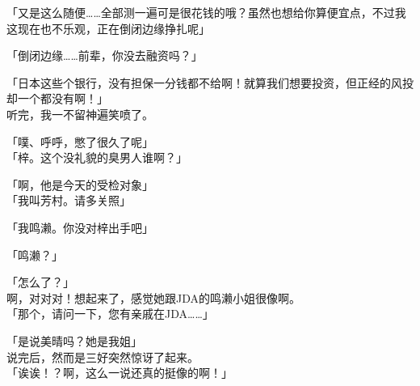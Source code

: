 「又是这么随便……全部测一遍可是很花钱的哦？虽然也想给你算便宜点，不过我这现在也不乐观，正在倒闭边缘挣扎呢」

「倒闭边缘……前辈，你没去融资吗？」

「日本这些个银行，没有担保一分钱都不给啊！就算我们想要投资，但正经的风投却一个都没有啊！」\\

听完，我一不留神遍笑喷了。

「噗、呼呼，憋了很久了呢」\\

「梓。这个没礼貌的臭男人谁啊？」

「啊，他是今天的受检对象」\\

「我叫芳村。请多关照」

「我鸣濑。你没对梓出手吧」

「鸣濑？」

「怎么了？」\\

啊，对对对！想起来了，感觉她跟JDA的鸣濑小姐很像啊。\\

「那个，请问一下，您有亲戚在JDA……」

「是说美晴吗？她是我姐」\\

说完后，然而是三好突然惊讶了起来。\\

「诶诶！？啊，这么一说还真的挺像的啊！」\\

